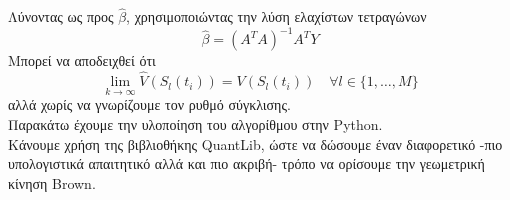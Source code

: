 \documentclass[12pt,a4paper,twoside,openany]{book}
\begin{document}
	Λύνοντας ως προς $\hat{\beta}$, χρησιμοποιώντας την λύση ελαχίστων τετραγώνων
	\[\hat{\beta}= (A^{T}A)^{-1}A^{T}Y\]
	Μπορεί να αποδειχθεί ότι
	\[\lim_{k\rightarrow\infty}\widehat{V}(S_l(t_i)) = V(S_l(t_i))\quad\forall l\in\{1,\dots,M\}  \]
	αλλά χωρίς να γνωρίζουμε τον ρυθμό σύγκλισης.
	\vspace{2.5mm}\\
 	Παρακάτω έχουμε την υλοποίηση του αλγορίθμου στην Python. \\Κάνουμε χρήση της βιβλιοθήκης QuantLib, ώστε να δώσουμε έναν διαφορετικό -πιο υπολογιστικά απαιτητικό αλλά και πιο ακριβή- τρόπο να ορίσουμε την γεωμετρική κίνηση Brown.
 	
 	\vspace{4mm}
\end{document}
